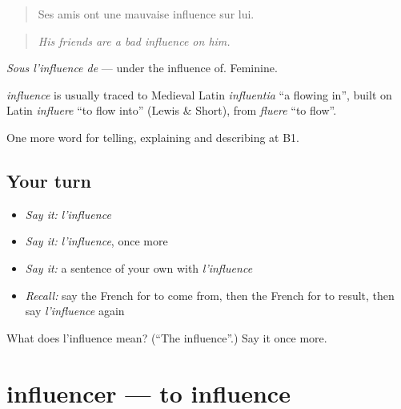\begin{quote}
Ses amis ont une mauvaise influence sur lui.
\end{quote}

\begin{quote}
\emph{His friends are a bad influence on him.}
\end{quote}

\emph{Sous l'influence de} — under the influence of. Feminine.

\begin{cousinweb}
\emph{influence} is usually traced to Medieval Latin \emph{influentia} \textquotedblleft{}a flowing in\textquotedblright{}, built on Latin \emph{influere} \textquotedblleft{}to flow into\textquotedblright{} (Lewis \& Short), from \emph{fluere} \textquotedblleft{}to flow\textquotedblright{}.
\end{cousinweb}

\begin{grammarlens}[title={What you've built}]
One more word for telling, explaining and describing at B1.
\end{grammarlens}

\subsection*{Your turn}
\begin{itemize}
\raggedright
  \item \emph{Say it:} \emph{l'influence}
  \item \emph{Say it:} \emph{l'influence}, once more
  \item \emph{Say it:} a sentence of your own with \emph{l'influence}
  \item \emph{Recall:} say the French for to come from, then the French for to result, then say \emph{l'influence} again
\end{itemize}

\begin{tcolorbox}[breakable,colback=teal!4,colframe=teal!35!black,title={Before you move on}]
What does l'influence mean? (\textquotedblleft{}The influence\textquotedblright{}.) Say it once more.
\end{tcolorbox}
\section[influencer]{influencer — to influence}

\label{lesson:FR-C349-influencer}



